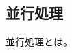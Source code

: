 \documentclass[../../../main]{subfiles}
\begin{document}
    \subsection{並行処理}\label{subsec:phraseology-concurrency}

    並行処理とは。
\end{document}
